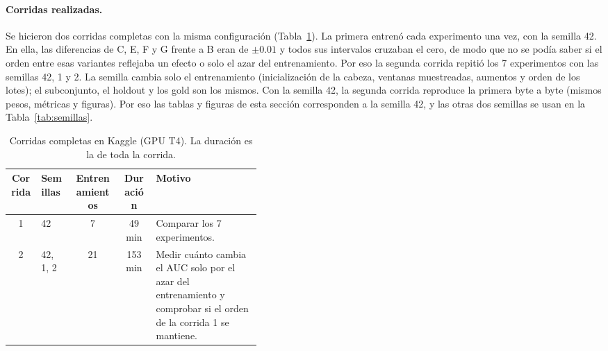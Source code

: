 \paragraph{Corridas realizadas.}
Se hicieron dos corridas completas con la misma configuración (Tabla~\ref{tab:corridas}).
La primera entrenó cada experimento una vez, con la semilla 42.
En ella, las diferencias de C, E, F y G frente a B eran de $\pm0.01$ y todos sus intervalos cruzaban el cero, de modo que no se podía saber si el orden entre esas variantes reflejaba un efecto o solo el azar del entrenamiento.
Por eso la segunda corrida repitió los 7 experimentos con las semillas 42, 1 y 2.
La semilla cambia solo el entrenamiento (inicialización de la cabeza, ventanas muestreadas, aumentos y orden de los lotes); el subconjunto, el holdout y los gold son los mismos.
Con la semilla 42, la segunda corrida reproduce la primera byte a byte (mismos pesos, métricas y figuras).
Por eso las tablas y figuras de esta sección corresponden a la semilla 42, y las otras dos semillas se usan en la Tabla~\ref{tab:semillas}.

\begin{table}[t]
  \caption{Corridas completas en Kaggle (GPU T4). La duración es la de toda la corrida.}
  \label{tab:corridas}
  \centering
  \small
  \begin{tabular}{@{}clccp{0.42\linewidth}@{}}
    \toprule
    Corrida & Semillas & Entrenamientos & Duración & Motivo \\
    \midrule
    1 & 42       &  7 &  49 min & Comparar los 7 experimentos. \\
    2 & 42, 1, 2 & 21 & 153 min & Medir cuánto cambia el AUC solo por el azar del entrenamiento y comprobar si el orden de la corrida 1 se mantiene. \\
    \bottomrule
  \end{tabular}
\end{table}

